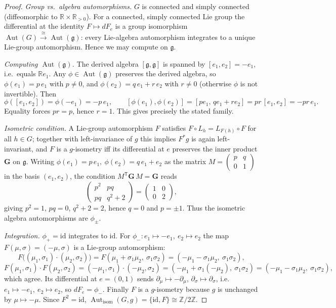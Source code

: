 \documentclass{amsart}
\theoremstyle{definition}
\theoremstyle{remark}
\begin{document}
\begin{proof}
\emph{Group vs.\ algebra automorphisms.} $G$ is connected and simply connected (diffeomorphic to
$\mathbb R\times\mathbb R_{>0}$). For a connected, simply connected Lie group the differential at the identity
$F\mapsto d F_e$ is a group isomorphism $\operatorname{Aut}(G)\xrightarrow{\cong}\operatorname{Aut}(\mathfrak g)$:
every Lie-algebra automorphism integrates to a unique Lie-group automorphism. Hence we may compute on
$\mathfrak g$.

\emph{Computing $\operatorname{Aut}(\mathfrak g)$.} The derived algebra $[\mathfrak g,\mathfrak g]$ is spanned by
$[e_1,e_2]=-e_1$, i.e.\ equals $\mathbb R e_1$. Any $\phi\in\operatorname{Aut}(\mathfrak g)$ preserves the derived
algebra, so $\phi(e_1)=p\,e_1$ with $p\neq0$, and $\phi(e_2)=q\,e_1+r\,e_2$ with $r\neq0$ (otherwise $\phi$ is not
invertible). Then
\[
\phi([e_1,e_2])=\phi(-e_1)=-p\,e_1,\qquad
[\phi(e_1),\phi(e_2)]=[p e_1,\,q e_1+r e_2]=pr\,[e_1,e_2]=-pr\,e_1.
\]
Equality forces $pr=p$, hence $r=1$. This gives precisely the stated family.

\emph{Isometric condition.} A Lie-group automorphism $F$ satisfies $F\circ L_h=L_{F(h)}\circ F$ for all $h\in G$;
together with left-invariance of $g$ this implies $F^{*}g$ is again left-invariant, and $F$ is a $g$-isometry iff
its differential at $e$ preserves the inner product $\mathbf G$ on $\mathfrak g$. Writing
$\phi(e_1)=p\,e_1,\ \phi(e_2)=q\,e_1+e_2$ as the matrix
$M=\left(\begin{smallmatrix}p&q\\0&1\end{smallmatrix}\right)$ in the basis $(e_1,e_2)$, the condition
$M^{\mathsf T}\mathbf G\,M=\mathbf G$ reads
\[
\begin{pmatrix}p^2 & pq\\ pq & q^2+2\end{pmatrix}=\begin{pmatrix}1&0\\0&2\end{pmatrix},
\]
giving $p^2=1$, $pq=0$, $q^2+2=2$, hence $q=0$ and $p=\pm1$. Thus the isometric algebra automorphisms are
$\phi_{\pm}$.

\emph{Integration.} $\phi_+=\mathrm{id}$ integrates to $\mathrm{id}$. For $\phi_-:e_1\mapsto-e_1,\ e_2\mapsto e_2$
the map $F(\mu,\sigma)=(-\mu,\sigma)$ is a Lie-group automorphism:
\[
F\bigl((\mu_1,\sigma_1)\cdot(\mu_2,\sigma_2)\bigr)=F(\mu_1+\sigma_1\mu_2,\ \sigma_1\sigma_2)
=(-\mu_1-\sigma_1\mu_2,\ \sigma_1\sigma_2),
\]
\[
F(\mu_1,\sigma_1)\cdot F(\mu_2,\sigma_2)=(-\mu_1,\sigma_1)\cdot(-\mu_2,\sigma_2)
=(-\mu_1+\sigma_1(-\mu_2),\ \sigma_1\sigma_2)=(-\mu_1-\sigma_1\mu_2,\ \sigma_1\sigma_2),
\]
which agree. Its differential at $e=(0,1)$ sends $\partial_\mu\mapsto-\partial_\mu$,
$\partial_\sigma\mapsto\partial_\sigma$, i.e.\ $e_1\mapsto -e_1,\ e_2\mapsto e_2$, so $dF_e=\phi_-$. Finally $F$
is a $g$-isometry because $g$ is unchanged by $\mu\mapsto-\mu$. Since $F^2=\mathrm{id}$,
$\operatorname{Aut}_{\mathrm{isom}}(G,g)=\{\mathrm{id},F\}\cong\mathbb Z/2\mathbb Z$.
\end{proof}
\end{document}

